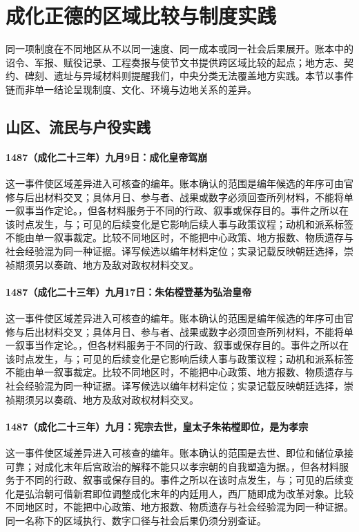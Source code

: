 \section{成化正德的区域比较与制度实践}

同一项制度在不同地区从不以同一速度、同一成本或同一社会后果展开。账本中的诏令、军报、赋役记录、工程奏报与使节文书提供跨区域比较的起点；地方志、契约、碑刻、遗址与异域材料则提醒我们，中央分类无法覆盖地方实践。本节以事件链而非单一结论呈现制度、文化、环境与边地关系的差异。

\subsection{山区、流民与户役实践}

\paragraph{1487（成化二十三年）九月9日：成化皇帝驾崩} 这一事件使区域差异进入可核查的编年。账本确认的范围是编年候选的年序可由官修与后出材料交叉；具体月日、参与者、战果或数字必须回查所列材料，不能将单一叙事当作定论。，但各材料服务于不同的行政、叙事或保存目的。事件之所以在该时点发生，与；可见的后续变化是它影响后续人事与政策议程；动机和派系标签不能由单一叙事裁定。比较不同地区时，不能把中心政策、地方报数、物质遗存与社会经验混为同一种证据。译写候选以编年材料定位；实录记载反映朝廷选择，崇祯期须另以奏疏、地方及敌对政权材料交叉。

\paragraph{1487（成化二十三年）九月17日：朱佑樘登基为弘治皇帝} 这一事件使区域差异进入可核查的编年。账本确认的范围是编年候选的年序可由官修与后出材料交叉；具体月日、参与者、战果或数字必须回查所列材料，不能将单一叙事当作定论。，但各材料服务于不同的行政、叙事或保存目的。事件之所以在该时点发生，与；可见的后续变化是它影响后续人事与政策议程；动机和派系标签不能由单一叙事裁定。比较不同地区时，不能把中心政策、地方报数、物质遗存与社会经验混为同一种证据。译写候选以编年材料定位；实录记载反映朝廷选择，崇祯期须另以奏疏、地方及敌对政权材料交叉。

\paragraph{1487（成化二十三年）九月：宪宗去世，皇太子朱祐樘即位，是为孝宗} 这一事件使区域差异进入可核查的编年。账本确认的范围是去世、即位和储位承接可靠；对成化末年后宫政治的解释不能只以孝宗朝的自我塑造为据。，但各材料服务于不同的行政、叙事或保存目的。事件之所以在该时点发生，与；可见的后续变化是弘治朝可借新君即位调整成化末年的内廷用人，西厂随即成为改革对象。比较不同地区时，不能把中心政策、地方报数、物质遗存与社会经验混为同一种证据。同一名称下的区域执行、数字口径与社会后果仍须分别查证。

